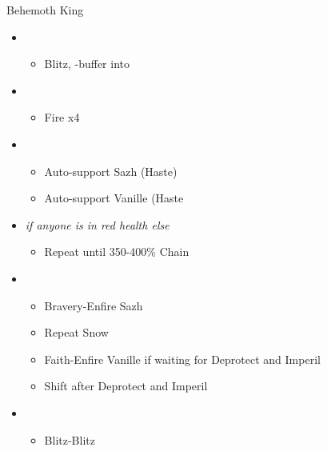 \begin{multicols}{2}
\begin{battle}{Behemoth King}
\begin{itemize}
    \item \second
    \begin{itemize}
        \item Blitz, \rav-buffer into
    \end{itemize}
    \item \sixth
    \begin{itemize}
        \item Fire x4
    \end{itemize}
    \item \fourth
    \begin{itemize}
        \item Auto-support Sazh (Haste)
        \item Auto-support Vanille (Haste
    \end{itemize}
    \item \fifth \textit{if anyone is in red health else} \sixth
    \begin{itemize}
        \item Repeat until 350-400\% Chain
    \end{itemize}
    \item \third
    \begin{itemize}
        \item Bravery-Enfire Sazh
        \item Repeat Snow
        \item Faith-Enfire Vanille if waiting for Deprotect and Imperil
        \item Shift after Deprotect and Imperil
    \end{itemize}
    \item \second
    \begin{itemize}
        \item Blitz-Blitz
    \end{itemize}
\end{itemize}
\end{battle}


\end{multicols}
